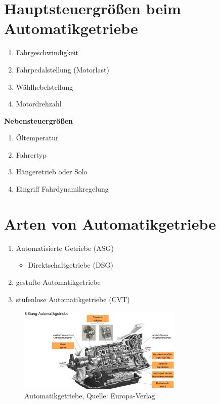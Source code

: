\section{Hauptsteuergrößen beim
Automatikgetriebe}\label{hauptsteuergroessen-beim-automatikgetriebe}

\begin{enumerate}
\item
  Fahrgeschwindigkeit
\item
  Fahrpedalstellung (Motorlast)
\item
  Wählhebelstellung
\item
  Motordrehzahl
\end{enumerate}

\textbf{Nebensteuergrößen}

\begin{enumerate}
\item
  Öltemperatur
\item
  Fahrertyp
\item
  Hängeretrieb oder Solo
\item
  Eingriff Fahrdynamikregelung
\end{enumerate}

\section{Arten von
Automatikgetriebe}\label{arten-von-automatikgetriebe}

\begin{enumerate}
\item
  Automatisierte Getriebe (ASG)

  \begin{itemize}
  \item
    Direktschaltgetriebe (DSG)
  \end{itemize}
\item
  gestufte Automatikgetriebe
\item
  stufenlose Automatikgetriebe (CVT)
\end{enumerate}

\begin{figure}[!ht]%
\centering
\includegraphics[width=0.7\textwidth]{images/Automatikgetriebe/Automatikgetriebe-1.pdf}
\caption{Automatikgetriebe, Quelle: Europa-Verlag}
\end{figure}

